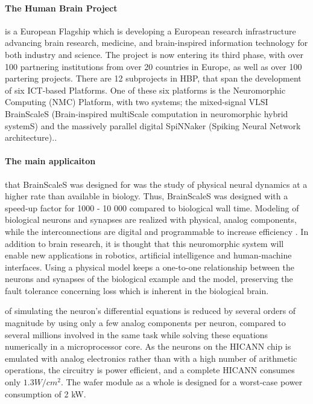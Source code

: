 \paragraph{The Human Brain Project} is a European Flagship which is developing a European research infrastructure advancing brain research, medicine, and brain-inspired information technology for both industry and science.
The project is now entering its third phase, with over 100 partnering institutions from over 20 countries in Europe, as well as over 100 partering projects.
There are 12 subprojects in HBP, that span the development of six ICT-based Platforms.
One of these six platforms is the Neuromorphic Computing (NMC) Platform, with two systems;
the mixed-signal VLSI BrainScaleS (Brain-inspired multiScale computation in neuromorphic hybrid systemS) and the massively parallel digital SpiNNaker (Spiking Neural Network architecture).\cite{amunts_human_2016}.

\paragraph{The main applicaiton} that BrainScaleS was designed for was the study of physical neural dynamics at a higher rate than available in biology.
Thus, BrainScaleS was designed with a speed-up factor for 1000 - 10 000 compared to biological wall time.
Modeling of biological neurons and synapses are realized with physical, analog components, while the interconnections are digital and programmable to increase efficiency \cite{zoschke_full_2017}.
In addition to brain research, it is thought that this neuromorphic system will enable new applications in robotics, artificial intelligence and human-machine interfaces.
Using a physical model keeps a one-to-one relationship between the neurons and synapses of the biological example and the model,
preserving the fault tolerance concerning loss which is inherent in the biological brain.

 of simulating the neuron's differential equations is reduced by several orders of magnitude by using only a few analog components per neuron, compared to several millions involved in the same task while solving these equations numerically in a microprocessor core.
\cite{schemmel_wafer-scale_2010}
As the neurons on the HICANN chip is emulated with analog electronics rather than with a high number of arithmetic operations, the circuitry is power efficient, and a complete HICANN consumes only $1.3 W/cm^2$.
The wafer module as a whole is designed for a worst-case power consumption of 2 kW.
\cite{zoschke_full_2017}


